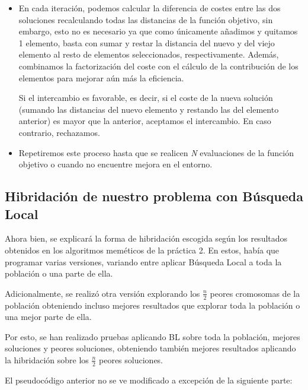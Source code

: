 \begin{itemize}
	
	\item En cada iteración, podemos calcular la diferencia de costes entre las dos soluciones recalculando todas las distancias de la función objetivo, sin embargo, esto no es necesario ya que como únicamente añadimos y quitamos 1 elemento, basta con sumar y restar la distancia del nuevo y del viejo elemento al resto de elementos seleccionados, respectivamente. Además, combinamos la factorización del coste con el cálculo de la contribución de los elementos para mejorar aún más la eficiencia.
	
	
	
	Si el intercambio es favorable, es decir, si el coste de la nueva solución (sumando las distancias del nuevo elemento y restando las del elemento anterior) es mayor que la anterior, aceptamos el intercambio. En caso contrario, rechazamos.
	
	\item Repetiremos este proceso hasta que se realicen \textit{N} evaluaciones de la función objetivo o cuando no encuentre mejora en el entorno.
	
\end{itemize}

\newpage 
\subsection{Hibridación de nuestro problema con Búsqueda Local}
Ahora bien, se explicará la forma de hibridación escogida según los resultados obtenidos en los algoritmos meméticos de la práctica 2.
En estos, había que programar varias versiones, variando entre aplicar Búsqueda Local a toda la población o una parte de ella.

Adicionalmente, se realizó otra versión explorando los $\frac{n}{2}$ peores cromosomas de la población obteniendo incluso mejores resultados que explorar toda la población o una mejor parte de ella.


Por esto, se han realizado pruebas aplicando BL sobre toda la población, mejores soluciones y peores soluciones, obteniendo también mejores resultados aplicando la hibridación sobre los $\frac{n}{2}$ peores soluciones.

El pseudocódigo anterior no se ve modificado a excepción de la siguiente parte:




